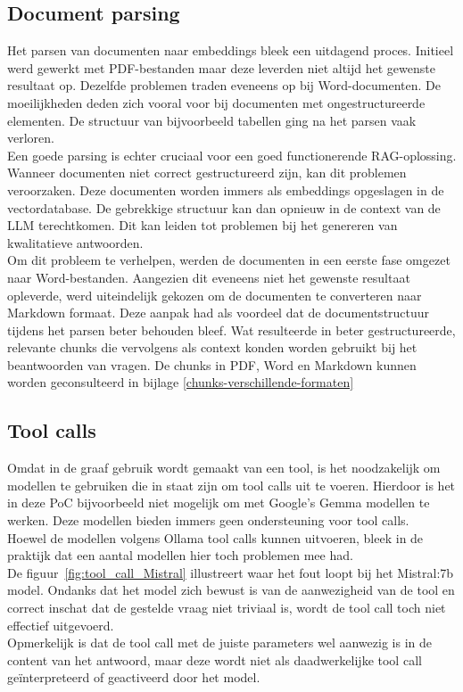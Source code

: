 \subsection{Document parsing}
Het parsen van documenten naar embeddings bleek een uitdagend proces. Initieel werd gewerkt met PDF-bestanden maar deze leverden niet altijd het gewenste resultaat op. Dezelfde problemen traden eveneens op bij Word-documenten. De moeilijkheden deden zich vooral voor bij documenten met ongestructureerde elementen. De structuur van bijvoorbeeld tabellen ging na het parsen vaak verloren.
\\[1em]
Een goede parsing is echter cruciaal voor een goed functionerende RAG-oplossing. Wanneer documenten niet correct gestructureerd zijn, kan dit problemen veroorzaken. Deze documenten worden immers als embeddings opgeslagen in de vectordatabase. De gebrekkige structuur kan dan opnieuw in de context van de LLM terechtkomen. Dit kan leiden tot problemen bij het genereren van kwalitatieve antwoorden.
\\[1em]
Om dit probleem te verhelpen, werden de documenten in een eerste fase omgezet naar Word-bestanden. Aangezien dit eveneens niet het gewenste resultaat opleverde, werd uiteindelijk gekozen om de documenten te converteren naar Markdown formaat. Deze aanpak had als voordeel dat de documentstructuur tijdens het parsen beter behouden bleef. Wat resulteerde in beter gestructureerde, relevante chunks die vervolgens als context konden worden gebruikt bij het beantwoorden van vragen. De chunks in PDF, Word en Markdown kunnen worden geconsulteerd in bijlage \ref{chunks-verschillende-formaten}

\subsection{Tool calls}
\label{tool-calls}

Omdat in de graaf gebruik wordt gemaakt van een tool, is het noodzakelijk om modellen te gebruiken die in staat zijn om tool calls uit te voeren. Hierdoor is het in deze PoC bijvoorbeeld niet mogelijk om met Google's Gemma modellen te werken. Deze modellen bieden immers geen ondersteuning voor tool calls.
\\[1em]
Hoewel de modellen volgens Ollama tool calls kunnen uitvoeren, bleek in de praktijk dat een aantal modellen hier toch problemen mee had.
\\[1em]
De figuur~\ref{fig:tool_call_Mistral} illustreert waar het fout loopt bij het Mistral:7b model. Ondanks dat het model zich bewust is van de aanwezigheid van de tool en correct inschat dat de gestelde vraag niet triviaal is, wordt de tool call toch niet effectief uitgevoerd.
\\[1em]
Opmerkelijk is dat de tool call met de juiste parameters wel aanwezig is in de content van het antwoord, maar deze wordt niet als daadwerkelijke tool call geïnterpreteerd of geactiveerd door het model.

